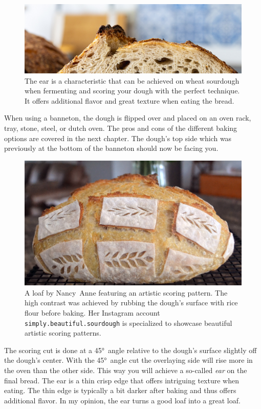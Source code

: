 \begin{figure}[htb!]
  \includegraphics[width=\textwidth]{the-ear}
  \caption[Bread's ear]{The ear is a characteristic that can be achieved on
      wheat sourdough when fermenting and scoring your dough with the perfect
      technique. It offers additional flavor and great texture when eating the
      bread.}%
  \label{fig:the-ear}
\end{figure}

When using a banneton, the dough is flipped over and
placed on an oven rack, tray, stone, steel, or dutch oven. The pros
and cons of the different baking options are covered in the next chapter.
The dough's top side which was previously at the bottom of the
banneton should now be facing you.

\begin{figure}[htb!]
  \includegraphics[width=\textwidth]{artistic-scoring}
  \caption[Artistic scoring]{A loaf by Nancy~Anne featuring an artistic
      scoring pattern.  The high contrast was achieved by rubbing the dough's
      surface with rice flour before baking. Her Instagram account
      \texttt{simply.beautiful.sourdough} is specialized to showcase beautiful
      artistic scoring patterns.}%
  \label{fig:artistic-scoring}
\end{figure}

The scoring cut is done at a \ang{45}~angle relative to the dough's
surface slightly off the dough's center. With the \ang{45}~angle cut
the overlaying side will rise more in the oven than the other side.
This way you will achieve a so-called \emph{ear} on the final bread.
The ear is a thin crisp edge that offers intriguing texture
when eating. The thin edge is typically a bit darker after baking
and thus offers additional flavor. In my opinion, the ear turns
a good loaf into a great loaf.

